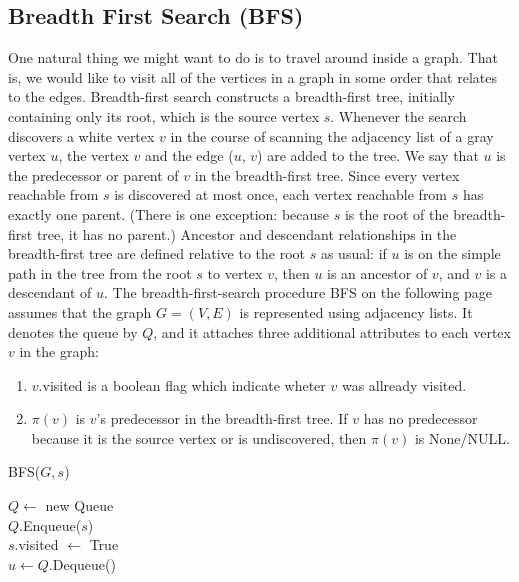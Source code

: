 \subsection{Breadth First Search (BFS)}

One natural thing we might want to do is to travel around inside a graph. That is, we would like to visit all of the vertices in a graph in some order that relates to the edges. 
Breadth-first search constructs a breadth-first tree, initially containing only its root, which is the source vertex $s$. Whenever the search discovers a white vertex $v$ in the course of scanning the adjacency list of a gray vertex $u$, the vertex $v$ and the edge ($u$, $v$) are added to the tree. We say that $u$ is the predecessor or parent of $v$ in the breadth-first tree. Since every vertex reachable from $s$ is discovered at most once, each vertex reachable from $s$ has exactly one parent. (There is one exception: because $s$ is the root of the breadth-first tree, it has no parent.) Ancestor and descendant relationships in the breadth-first tree are defined relative to the root $s$ as usual: if $u$ is on the simple path in the tree from the root $s$ to vertex $v$, then $u$ is an ancestor of $v$, and $v$ is a descendant of $u$.
The breadth-first-search procedure BFS on the following page assumes that the graph $G = (V, E)$ is represented using adjacency lists. It denotes the queue by $Q$, and it attaches three additional attributes to each vertex $v$ in the graph:

\begin{enumerate}
    \item $v$.visited is a boolean flag which indicate wheter $v$ was allready visited.
    \item $\pi(v)$ is $v$’s predecessor in the breadth-first tree. If $v$ has no predecessor because it is the source vertex or is undiscovered, then $\pi(v)$ is None/NULL.
\end{enumerate}

  \begin{algorithm}
  \caption{BFS($G, s$)}
 $Q\leftarrow$ new Queue \\ 
 $Q$.Enqueue($s$) \\
 $s$.visited $\leftarrow$ True \\
  {
 $u\leftarrow Q$.Dequeue() \\
	 {
	}
      }
  \end{algorithm}

